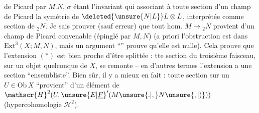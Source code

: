 \margin{\mbox{-- --}}

 de Picard  par $M.N$, $\sigma$ étant l'invariant qui  associant à toute section  d'un champ de Picard la symétrie de $\deleted{\unsure{N|L}}L\otimes L$, interprétée comme section de ${}_{2}N$. Je sais prouver (sauf erreur) que tout hom. $M\to{}_{2}N$ provient d'un champ de Picard convenable (épinglé par $M,N$) (a priori l'obstruction est dans $\mathrm{Ext}^{3}(X;M,N)$, mais un argument ``'' prouve qu'elle est nulle). Cela prouve que l'extension $(*)$ est bien proche d'être splittée :  tte section du troisième faisceau, sur un objet quelconque de $X$, se remonte -- en d'autres termes l'extension a une section ``ensembliste''. Bien sûr, il y a mieux en fait : toute section sur un $U\in\mathrm{Ob}\,X$ ``provient'' d'un élément de $\mathscr{H}^{2}(U,{\unsure{E|\underline{F}}}'(M\unsure{.|,}N\unsure{,|)}))$ (hypercohomologie $\mathscr{H}^{2}$).

